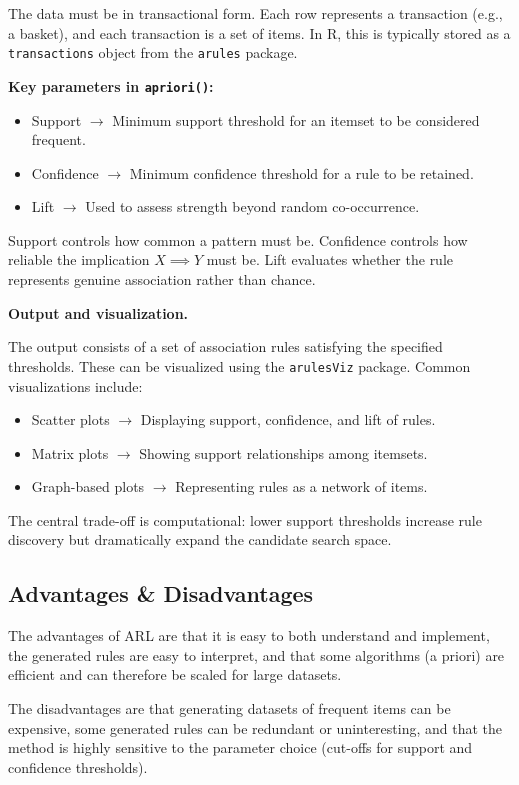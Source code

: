\medskip

The data must be in transactional form. Each row represents a transaction (e.g., a basket), and each transaction is a set of items. In R, this is typically stored as a \texttt{transactions} object from the \texttt{arules} package.

\medskip

\textbf{Key parameters in \texttt{apriori()}:}
\begin{itemize}[label=$\circ$, itemsep=0.4em]
    \item Support $\longrightarrow$ Minimum support threshold for an itemset to be considered frequent.
    \item Confidence $\longrightarrow$ Minimum confidence threshold for a rule to be retained.
    \item Lift $\longrightarrow$ Used to assess strength beyond random co-occurrence.
\end{itemize}

Support controls how common a pattern must be. Confidence controls how reliable the implication $X \implies Y$ must be. Lift evaluates whether the rule represents genuine association rather than chance.

\medskip

\textbf{Output and visualization.}

The output consists of a set of association rules satisfying the specified thresholds. These can be visualized using the \texttt{arulesViz} package. Common visualizations include:
\begin{itemize}[label=$\circ$, itemsep=0.4em]
    \item Scatter plots $\longrightarrow$ Displaying support, confidence, and lift of rules.
    \item Matrix plots $\longrightarrow$ Showing support relationships among itemsets.
    \item Graph-based plots $\longrightarrow$ Representing rules as a network of items.
\end{itemize}

The central trade-off is computational: lower support thresholds increase rule discovery but dramatically expand the candidate search space.

\bigskip

\subsection{Advantages \& Disadvantages}

\medskip

The advantages of ARL are that it is easy to both understand and implement, the generated rules are easy to interpret, and that some algorithms (a priori) are efficient and can therefore be scaled for large datasets. 

The disadvantages are that generating datasets of frequent items can be expensive, some generated rules can be redundant or uninteresting, and that the method is highly sensitive to the parameter choice (cut-offs for support and confidence thresholds).

